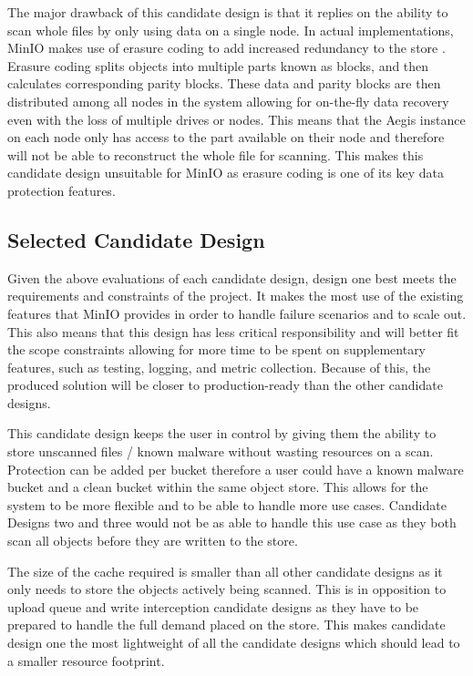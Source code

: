 \documentclass[12pt, conference, final, a4paper, onecolumn, compsoc]{IEEEtran}
\begin{document}
The major drawback of this candidate design is that it replies on the ability to
scan whole files by only using data on a single node. In actual implementations,
MinIO makes use of erasure coding to add increased redundancy to the store
\citep{minio-erasure}. Erasure coding splits objects into multiple parts known
as blocks, and then calculates corresponding parity blocks. These data and
parity blocks are then distributed among all nodes in the system allowing for
on-the-fly data recovery even with the loss of multiple drives or nodes. This
means that the Aegis instance on each node only has access to the part available
on their node and therefore will not be able to reconstruct the whole file for
scanning. This makes this candidate design unsuitable for MinIO as erasure
coding is one of its key data protection features.

\subsection{Selected Candidate Design}

Given the above evaluations of each candidate design, design one best meets the
requirements and constraints of the project. It makes the most use of the
existing features that MinIO provides in order to handle failure scenarios and
to scale out. This also means that this design has less critical responsibility
and will better fit the scope constraints allowing for more time to be spent on
supplementary features, such as testing, logging, and metric collection. Because
of this, the produced solution will be closer to production-ready than the other
candidate designs.

This candidate design keeps the user in control by giving them the ability to
store unscanned files / known malware without wasting resources on a scan.
Protection can be added per bucket therefore a user could have a known malware
bucket and a clean bucket within the same object store. This allows for the
system to be more flexible and to be able to handle more use cases. Candidate
Designs two and three would not be as able to handle this use case as they both
scan all objects before they are written to the store.

The size of the cache required is smaller than all other candidate designs as it
only needs to store the objects actively being scanned. This is in opposition to
upload queue and write interception candidate designs as they have to be
prepared to handle the full demand placed on the store. This makes candidate
design one the most lightweight of all the candidate designs which should lead
to a smaller resource footprint.
\end{document}
